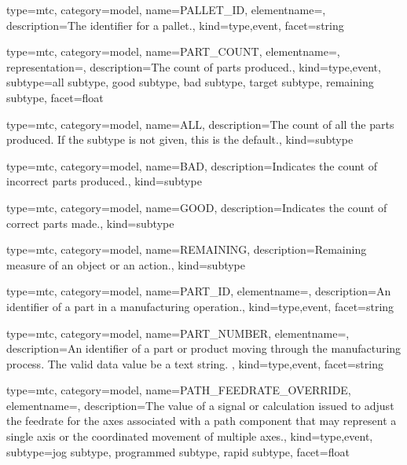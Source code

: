 {
  type=mtc,
  category=model,
  name={PALLET\_ID},
  elementname=,
  description={The identifier for a pallet.},
  kind={type,event},
  facet={\gls{string}}
}


{
  type=mtc,
  category=model,
  name={PART\_COUNT},
  elementname=,
  representation=,
  description={The count of parts produced.},
  kind={type,event},
  subtype={\gls{all subtype}, \gls{good subtype}, \gls{bad subtype}, \gls{target subtype}, \gls{remaining subtype}},
  facet={\gls{float}}
}


{
  type=mtc,
  category=model,
  name={ALL},
  description={The count of all the parts produced.  If the subtype is not given, this is the default.},
  kind={subtype}
}


{
  type=mtc,
  category=model,
  name={BAD},
  description={Indicates the count of incorrect parts produced.},
  kind={subtype}
}


{
  type=mtc,
  category=model,
  name={GOOD},
  description={Indicates the count of correct parts made.},
  kind={subtype}
}


{
  type=mtc,
  category=model,
  name={REMAINING},
  description={Remaining measure of an object or an action.},
  kind={subtype}
}


{
  type=mtc,
  category=model,
  name={PART\_ID},
  elementname=,
  description={An identifier of a part in a manufacturing operation.},
  kind={type,event},
  facet={\gls{string}}
}


{
  type=mtc,
  category=model,
  name={PART\_NUMBER},
  elementname=,
  description={An identifier of a part or product moving through the manufacturing process. \newline The \gls{valid data value} \must be a text string. },
  kind={type,event},
  facet={\gls{string}}
}


{
  type=mtc,
  category=model,
  name={PATH\_FEEDRATE\_OVERRIDE},
  elementname=,
  description={The value of a signal or calculation issued to adjust the feedrate for the axes associated with a \gls{path} component that may represent a single axis or the coordinated movement of multiple axes.},
  kind={type,event},
  subtype={\gls{jog subtype}, \gls{programmed subtype}, \gls{rapid subtype}},
  facet={\gls{float}}
}


